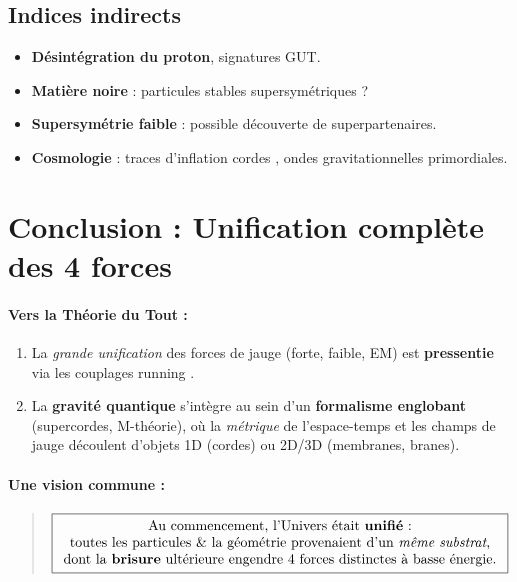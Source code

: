 \documentclass[12pt]{article}
\begin{document}
\subsection{Indices indirects}
\begin{itemize}
\item \textbf{Désintégration du proton}, signatures GUT.  
\item \textbf{Matière noire} : particules stables supersymétriques ?  
\item \textbf{Supersymétrie faible} : possible découverte de superpartenaires.  
\item \textbf{Cosmologie} : traces d'inflation \og cordes \fg, ondes gravitationnelles primordiales.
\end{itemize}

\section{Conclusion : Unification complète des 4 forces}
\label{sec:conclusion}

\paragraph{Vers la \og Théorie du Tout \fg:}
\begin{enumerate}
\item La \emph{grande unification} des forces de jauge (forte, faible, EM) est \textbf{pressentie} via les couplages \og running \fg.  
\item La \textbf{gravité quantique} s'intègre au sein d'un \textbf{formalisme englobant} (supercordes, M-théorie), 
      où la \emph{métrique} de l'espace-temps et les champs de jauge découlent d'objets 1D (cordes) 
      ou 2D/3D (membranes, branes).
\end{enumerate}

\paragraph{Une vision commune :}
\begin{quote}
\begin{align}
\boxed{
\begin{array}{c}
\text{Au commencement, l'Univers était \textbf{unifié} :} \\
\text{toutes les particules \& la géométrie provenaient d'un \emph{même substrat},} \\
\text{dont la \textbf{brisure} ultérieure engendre 4 forces distinctes à basse énergie.}
\end{array}
}
\end{align}
\end{quote}
\end{document}
